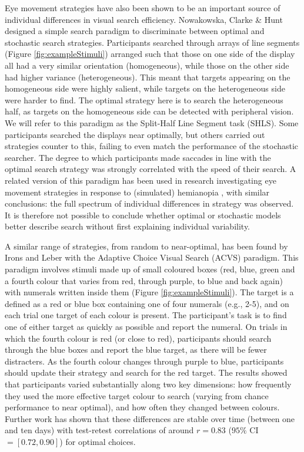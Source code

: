 \documentclass[Afour, sageapa, times]{sagej}
\begin{document}
Eye movement strategies have also been shown to be an important source of individual differences in visual search efficiency. Nowakowska, Clarke & Hunt \citeyear{nowakowska2017} designed a simple search paradigm to discriminate between optimal \cite{najemnik-geisler2008} and stochastic  \cite{clarke2016} search strategies. Participants searched through arrays of line segments (Figure \ref{fig:exampleStimuli}) arranged such that those on one side of the display all had a very similar orientation (homogeneous), while those on the other side had higher variance (heterogeneous). This meant that targets appearing on the homogeneous side were highly salient, while targets on the heterogeneous side were harder to find. The optimal strategy here is to search the heterogeneous half, as targets on the homogeneous side can be detected with peripheral vision. We will refer to this paradigm as the Split-Half Line Segment task (SHLS). Some participants searched the displays near optimally, but others carried out strategies counter to this, failing to even match the performance of the stochastic searcher. The degree to which participants made saccades in line with the optimal search strategy was strongly correlated with the speed of their search. A related version of this paradigm has been used in research investigating eye movement strategies in response to (simulated) hemianopia \cite{nowakowska2016,nowakowska2018}, with similar conclusions: the full spectrum of individual differences in strategy was observed. It is therefore not possible to conclude whether optimal or stochastic models better describe search without first explaining individual variability.

A similar range of strategies, from random to near-optimal, has been found by Irons and Leber \citeyear{irons-leber2016} with the Adaptive Choice Visual Search (ACVS) paradigm. This paradigm involves stimuli made up of small coloured boxes (red, blue, green and a fourth colour that varies from red, through purple, to blue and back again) with numerals written inside them (Figure \ref{fig:exampleStimuli}). The target is a defined as a red or blue box containing one of four numerals (e.g., 2-5), and on each trial one target of each colour is present. The participant's task is to find one of either target as quickly as possible and report the numeral. On trials in which the fourth colour is red (or close to red), participants should search through the blue boxes and report the blue target, as there will be fewer distracters. As the fourth colour changes through purple to blue, participants should update their strategy and search for the red target. The results showed that participants varied substantially along two key dimensions: how frequently they used the more effective target colour to search (varying from chance performance to near optimal), and how often they changed between colours. Further work \cite{irons-leber2018} has shown that these differences are stable over time (between one and ten days) with test-retest correlations of around $r = 0.83$ ($95\%$ CI $= [0.72, 0.90]$) for optimal choices.
\end{document}
